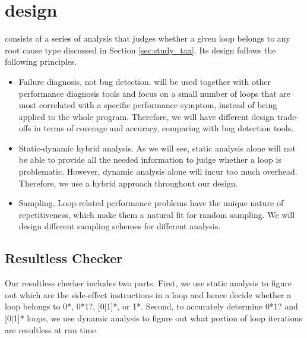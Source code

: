 \section{\Tool design}
\label{sec:design}
\Tool consists of a series of analysis that
judges whether a given loop belongs to any root cause type discussed in
Section \ref{sec:study_tax}.
Its design
follows the following principles.
\begin{itemize}
\item Failure diagnosis, not bug detection. \Tool will be  
used together with other performance diagnosis tools \cite{SongOOPSLA2014}
and focus on a small
number of loops that are most correlated with a specific performance symptom,
instead of being applied to the whole program. Therefore, we will have different
design trade-offs in terms of coverage and accuracy, comparing with 
bug detection tools.

\item Static-dynamic hybrid analysis. As we will see, static analysis alone
will not be able to provide all the needed information to judge whether
a loop is problematic. However, 
dynamic analysis alone will incur too much overhead.
Therefore, we use a hybrid approach throughout our design.

\item Sampling. Loop-related 
performance problems have the unique nature of repetitiveness, which make 
them a natural fit for random sampling. We will design different
sampling schemes for different analysis.
\end{itemize}

\subsection{Resultless Checker}
\label{sec:workless}

Our resultless checker includes two parts. First, we use static analysis
to figure out which are the side-effect instructions in a loop and hence
decide whether a loop belongs to 0*, 0*1?, [0$|$1]*, or 1*. Second, to
accurately determine 0*1? and [0$|$1]* loops, we use
dynamic analysis to figure out what portion of loop iterations are
resultless at run time.


